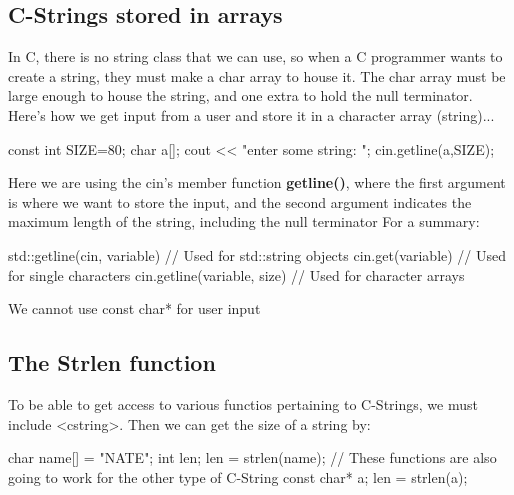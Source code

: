 \documentclass{report}
\begin{document}
    \pagebreak
    \subsection{C-Strings stored in arrays}
    \bigbreak \noindent 
    In C, there is no string class that we can use, so when a C programmer wants to create a string, they must make a char array to house it. The char array must be large enough to house the string, and one extra to hold the null terminator.
    \bigbreak \noindent 
    Here's how we get input from a user and store it in a character array (string)...
    \bigbreak \noindent 
    
    \begin{cppcode}
const int SIZE=80;
char a[];
cout << "enter some string: ";
cin.getline(a,SIZE);
    \end{cppcode}
    
    \bigbreak \noindent 
    Here we are using the cin's member function \textbf{getline()}, where the first argument is where we want to store the input, and the second argument indicates the maximum length of the string, including the null terminator
    \bigbreak \noindent 
    For a summary:
    \bigbreak \noindent 
    
    \begin{cppcode}
std::getline(cin, variable) // Used for std::string objects
cin.get(variable) // Used for single characters
cin.getline(variable, size) // Used for character arrays
    \end{cppcode}
    
    \bigbreak \noindent 
    \begin{notebox}
			We cannot use const char* for user input
		\end{notebox}

    \bigbreak \noindent 
    \subsection{The Strlen function}
    \bigbreak \noindent 
    To be able to get access to various functios pertaining to C-Strings, we must include <cstring>. Then we can get the size of a string by:
    \bigbreak \noindent 
    
    \begin{cppcode}
char name[] = "NATE";
int len;
len = strlen(name);
// These functions are also going to work for the other type of C-String
const char* a;
len = strlen(a);
    \end{cppcode}
    
\end{document}

